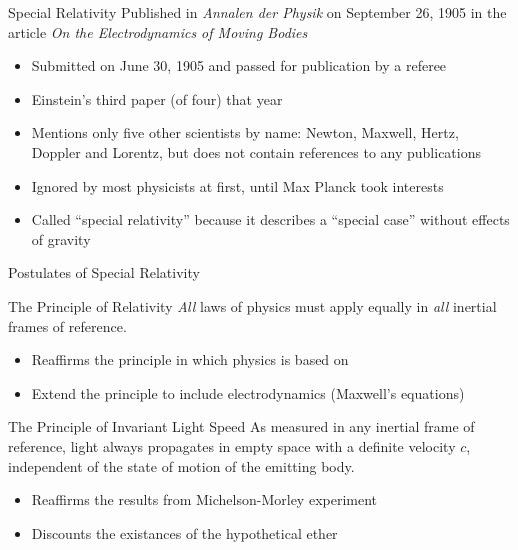 \documentclass[12pt,compress,aspectratio=169]{beamer}
\begin{document}
\begin{frame}{Special Relativity}
  Published in \emph{Annalen der Physik} on September 26, 1905 in the article
  \emph{On the Electrodynamics of Moving Bodies}
  \begin{itemize}
  \item Submitted on June 30, 1905 and passed for publication by a referee
  \item Einstein's third paper (of four) that year
  \item Mentions only five other scientists by name: Newton, Maxwell, Hertz,
    Doppler and Lorentz, but does not contain references to any publications
  \item Ignored by most physicists at first, until Max Planck took interests
  \item Called ``special relativity'' because it describes a ``special case''
    without effects of gravity
  \end{itemize}
\end{frame}



\begin{frame}{Postulates of Special Relativity}
  \begin{block}{The Principle of Relativity}
    \emph{All} laws of physics must apply equally in \emph{all} inertial frames
    of reference.
  \end{block}
  \begin{itemize}
  \item Reaffirms the principle in which physics is based on
  \item Extend the principle to include electrodynamics (Maxwell's equations)
  \end{itemize}

  \vspace{.1in}
  \begin{block}{The Principle of Invariant Light Speed}
    As measured in any inertial frame of reference, light always propagates in
    empty space with a definite velocity $c$, independent of the state of
    motion of the emitting body.
  \end{block}
  \begin{itemize}
  \item Reaffirms the results from Michelson-Morley experiment
  \item Discounts the existances of the  hypothetical ether
  \end{itemize}
\end{frame}
\end{document}
